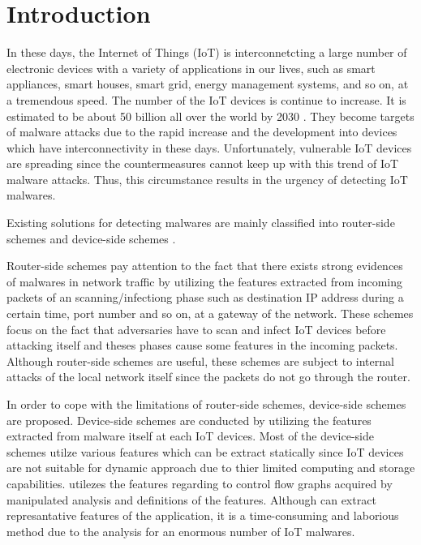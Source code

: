 \chapter{Introduction}\label{Sec:Introduction}

In these days, the Internet of Things (IoT) is interconnetcting a large number of electronic devices with a variety of applications in our lives, such as smart appliances, smart houses, smart grid, energy management systems, and so on, at a tremendous speed.
The number of the IoT devices is continue to increase.
It is estimated to be about 50 billion all over the world by 2030 \cite{}.
They become targets of malware attacks due to the rapid increase and the development into devices which have interconnectivity in these days.
Unfortunately, vulnerable IoT devices are spreading since the countermeasures cannot keep up with this trend of IoT malware attacks.
Thus, this circumstance results in the urgency of detecting IoT malwares.

Existing solutions for detecting malwares are mainly classified into router-side schemes \cite{} and device-side schemes \cite{}.

Router-side schemes pay attention to the fact that there exists strong evidences of malwares in network traffic by utilizing the features extracted from incoming packets of an scanning/infectiong phase such as destination IP address during a certain time, port number and so on, at a gateway of the network.
These schemes focus on the fact that adversaries have to scan and infect IoT devices before attacking itself and theses phases cause some features in the incoming packets.
Although router-side schemes are useful, these schemes are subject to internal attacks of the local network itself since the packets do not go through the router.

In order to cope with the limitations of router-side schemes, device-side schemes are proposed.
Device-side schemes are conducted by utilizing the features extracted from malware itself at each IoT devices.
Most of the device-side schemes utilze various features which can be extract statically since IoT devices are not suitable for dynamic approach due to thier limited computing and storage capabilities.
\cite{} utilezes the features regarding to control flow graphs acquired by manipulated analysis and definitions of the features.
Although \cite{} can extract represantative features of the application, it is a time-consuming and laborious method due to the analysis for an enormous number of IoT malwares.

